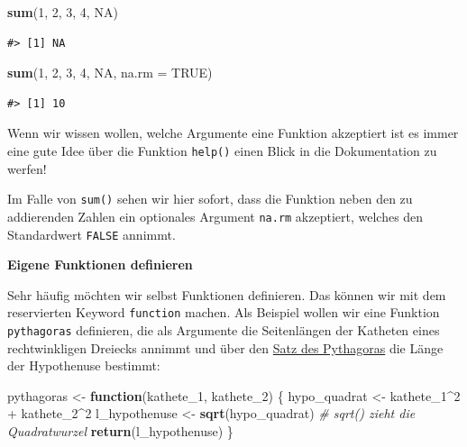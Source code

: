 \documentclass[]{tufte-book}
\newenvironment{Shaded}{}{}
\newcommand{\KeywordTok}[1]{\textcolor[rgb]{0.00,0.44,0.13}{\textbf{#1}}}
\newcommand{\DataTypeTok}[1]{\textcolor[rgb]{0.56,0.13,0.00}{#1}}
\newcommand{\DecValTok}[1]{\textcolor[rgb]{0.25,0.63,0.44}{#1}}
\newcommand{\StringTok}[1]{\textcolor[rgb]{0.25,0.44,0.63}{#1}}
\newcommand{\CommentTok}[1]{\textcolor[rgb]{0.38,0.63,0.69}{\textit{#1}}}
\newcommand{\OtherTok}[1]{\textcolor[rgb]{0.00,0.44,0.13}{#1}}
\newcommand{\ControlFlowTok}[1]{\textcolor[rgb]{0.00,0.44,0.13}{\textbf{#1}}}
\newcommand{\OperatorTok}[1]{\textcolor[rgb]{0.40,0.40,0.40}{#1}}
\newcommand{\NormalTok}[1]{#1}
\begin{document}
\begin{Shaded}
\begin{Highlighting}[]
\KeywordTok{sum}\NormalTok{(}\DecValTok{1}\NormalTok{, }\DecValTok{2}\NormalTok{, }\DecValTok{3}\NormalTok{, }\DecValTok{4}\NormalTok{, }\OtherTok{NA}\NormalTok{)}
\end{Highlighting}
\end{Shaded}

\begin{verbatim}
#> [1] NA
\end{verbatim}

\begin{Shaded}
\begin{Highlighting}[]
\KeywordTok{sum}\NormalTok{(}\DecValTok{1}\NormalTok{, }\DecValTok{2}\NormalTok{, }\DecValTok{3}\NormalTok{, }\DecValTok{4}\NormalTok{, }\OtherTok{NA}\NormalTok{, }\DataTypeTok{na.rm =} \OtherTok{TRUE}\NormalTok{)}
\end{Highlighting}
\end{Shaded}

\begin{verbatim}
#> [1] 10
\end{verbatim}

Wenn wir wissen wollen, welche Argumente eine Funktion akzeptiert ist es
immer eine gute Idee über die Funktion \texttt{help()} einen Blick in
die Dokumentation zu werfen!

Im Falle von \texttt{sum()} sehen wir hier sofort, dass die Funktion
neben den zu addierenden Zahlen ein optionales Argument \texttt{na.rm}
akzeptiert, welches den Standardwert \texttt{FALSE} annimmt.

\textbf{Eigene Funktionen definieren}

Sehr häufig möchten wir selbst Funktionen definieren. Das können wir mit
dem reservierten Keyword \texttt{function} machen. Als Beispiel wollen
wir eine Funktion \texttt{pythagoras} definieren, die als Argumente die
Seitenlängen der Katheten eines rechtwinkligen Dreiecks annimmt und über
den \href{https://de.wikipedia.org/wiki/Satz_des_Pythagoras}{Satz des
Pythagoras} die Länge der Hypothenuse bestimmt:

\begin{Shaded}
\begin{Highlighting}[]
\NormalTok{pythagoras <-}\StringTok{ }\ControlFlowTok{function}\NormalTok{(kathete_}\DecValTok{1}\NormalTok{, kathete_}\DecValTok{2}\NormalTok{) \{}
\NormalTok{    hypo_quadrat <-}\StringTok{ }\NormalTok{kathete_}\DecValTok{1}\OperatorTok{^}\DecValTok{2} \OperatorTok{+}\StringTok{ }\NormalTok{kathete_}\DecValTok{2}\OperatorTok{^}\DecValTok{2}
\NormalTok{    l_hypothenuse <-}\StringTok{ }\KeywordTok{sqrt}\NormalTok{(hypo_quadrat)  }\CommentTok{# sqrt() zieht die Quadratwurzel}
    \KeywordTok{return}\NormalTok{(l_hypothenuse)}
\NormalTok{\}}
\end{Highlighting}
\end{Shaded}
\end{document}
